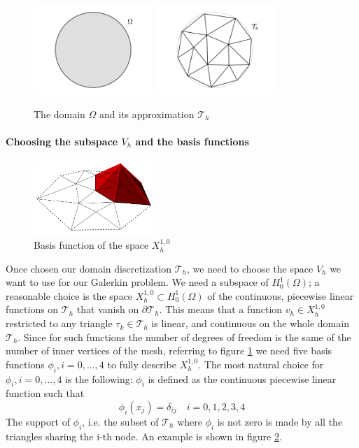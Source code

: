 \begin{figure}[h]
	\centering
	\includegraphics[width=0.4\textwidth]{figs/Chapter3/omega.png}
	\includegraphics[width=0.4\textwidth]{figs/Chapter3/mesh.png}
	\caption{\label{fig:omega and mesh}The domain $\Omega$ and its approximation $\mathcal T_h$}
\end{figure}
\paragraph{Choosing the subspace $V_h$ and the basis functions}
\begin{figure}
	\begin{center}
		\includegraphics[width=0.4\textwidth]{figs/Chapter3/basisfunction.png}
	\end{center}
	\caption{\label{fig:basis function}Basis function of the space $X^{1,0}_h$}
\end{figure}
Once chosen our domain discretization $\mathcal T_h$, we need to choose the space $V_h$ we want to use for our Galerkin problem. We need a subspace of $H_0^1(\Omega)$; a reasonable choice is the space $X_h^{1,0}\subset H_0^1(\Omega)$ of the continuous, piecewise linear functions on $\mathcal T_h$ that vanish on $\partial \mathcal T_h$. This means that a function $v_h\in X_h^{1,0}$ restricted to any triangle $\tau_k\in \mathcal T_h$ is linear, and continuous on the whole domain $\mathcal T_h$. Since for such functions the number of degrees of freedom is the same of the number of inner vertices of the mesh, referring to figure \ref{fig:omega and mesh} we need five basis functions $\phi_i, i=0,...,4$ to fully describe $X_h^{1,0}$. The most natural choice for $\phi_i, i=0,...,4$ is the following: $\phi_i$ is defined as the continuous piecewise linear function such that 
$$
\phi_i(x_j) = \delta_{ij}\quad i=0,1,2,3,4
$$
The support of $\phi_i$, i.e. the subset of $\mathcal T_h$ where $\phi_i$ is not zero is made by all the triangles sharing the i-th node. An example is shown in figure \ref{fig:basis function}.

